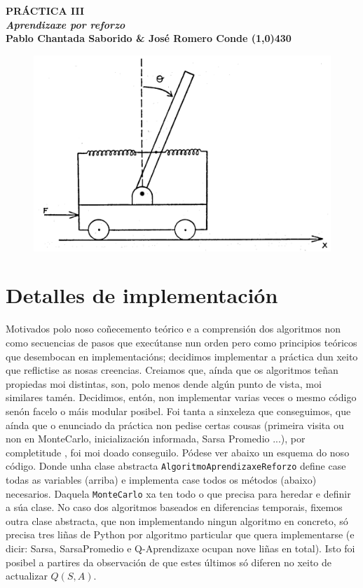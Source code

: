 \documentclass{article}
\begin{document}
\begin{center}
    \LARGE\bfseries PRÁCTICA III \\
    \large \emph{Aprendizaxe por reforzo} \\
    \small Pablo Chantada Saborido \& José Romero Conde
    \line(1,0){430}
\end{center}

\vspace{200}
\begin{figure}[h]
    \centering
    \includegraphics[width=1\linewidth]{portada.png}
    
\end{figure}

\thispagestyle{empty}
\newpage

\section{Detalles de implementación}

Motivados polo noso coñecemento teórico e a comprensión dos algoritmos non como secuencias de pasos que execútanse nun orden pero como principios teóricos que desembocan en implementacións; decidimos implementar a práctica dun xeito que reflictise as nosas creencias. Creiamos que, aínda que os algoritmos teñan propiedas moi distintas, son, polo menos dende algún punto de vista, moi similares tamén. Decidimos, entón, non implementar varias veces o mesmo código senón facelo o máis modular posibel. Foi tanta a sinxeleza que conseguimos, que aínda que o enunciado da práctica non pedise certas cousas (primeira visita ou non en MonteCarlo, inicialización informada, Sarsa Promedio ...), por completitude , foi moi doado conseguilo. Pódese ver abaixo un esquema do noso código. Donde unha clase abstracta \texttt{AlgoritmoAprendizaxeReforzo} define case todas as variables (arriba) e implementa case todos os métodos (abaixo) necesarios. Daquela \texttt{MonteCarlo} xa ten todo o que precisa para heredar e definir a súa clase. No caso dos algoritmos baseados en diferencias temporais, fixemos outra clase abstracta, que non implementando ningun algoritmo en concreto, só precisa tres liñas de Python por algoritmo particular que quera implementarse (e dicir: Sarsa, SarsaPromedio e Q-Aprendizaxe ocupan nove liñas en total). Isto foi posibel a partires da observación de que estes últimos só diferen no xeito de actualizar $Q(S,A)$.
\end{document}
